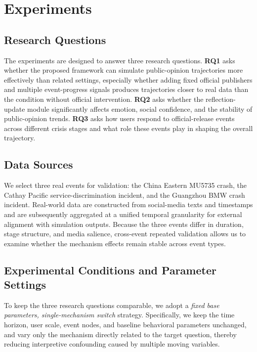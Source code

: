 \section{Experiments}

\subsection{Research Questions}

The experiments are designed to answer three research questions. \textbf{RQ1} asks whether the proposed framework can simulate public-opinion trajectories more effectively than related settings, especially whether adding fixed official publishers and multiple event-progress signals produces trajectories closer to real data than the condition without official intervention. \textbf{RQ2} asks whether the reflection-update module significantly affects emotion, social confidence, and the stability of public-opinion trends. \textbf{RQ3} asks how users respond to official-release events across different crisis stages and what role these events play in shaping the overall trajectory.

\subsection{Data Sources}

We select three real events for validation: the China Eastern MU5735 crash, the Cathay Pacific service-discrimination incident, and the Guangzhou BMW crash incident. Real-world data are constructed from social-media texts and timestamps and are subsequently aggregated at a unified temporal granularity for external alignment with simulation outputs. Because the three events differ in duration, stage structure, and media salience, cross-event repeated validation allows us to examine whether the mechanism effects remain stable across event types.

\subsection{Experimental Conditions and Parameter Settings}

To keep the three research questions comparable, we adopt a \emph{fixed base parameters, single-mechanism switch} strategy. Specifically, we keep the time horizon, user scale, event nodes, and baseline behavioral parameters unchanged, and vary only the mechanism directly related to the target question, thereby reducing interpretive confounding caused by multiple moving variables.

